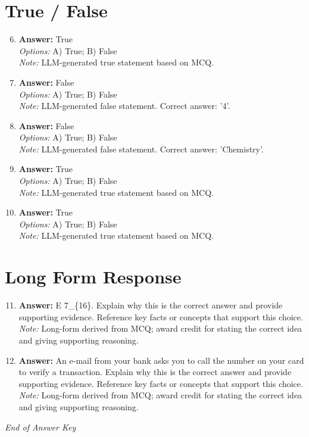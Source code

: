 \documentclass[12pt]{article}
\begin{document}
\section*{True / False}
\begin{enumerate}[label=\arabic*.]
\setcounter{enumi}{5}
\item \textbf{Answer:} True
\\ \textit{Options:} A) True; B) False
\\ \textit{Note:} LLM-generated true statement based on MCQ.
\item \textbf{Answer:} False
\\ \textit{Options:} A) True; B) False
\\ \textit{Note:} LLM-generated false statement. Correct answer: '4'.
\item \textbf{Answer:} False
\\ \textit{Options:} A) True; B) False
\\ \textit{Note:} LLM-generated false statement. Correct answer: 'Chemistry'.
\item \textbf{Answer:} True
\\ \textit{Options:} A) True; B) False
\\ \textit{Note:} LLM-generated true statement based on MCQ.
\item \textbf{Answer:} True
\\ \textit{Options:} A) True; B) False
\\ \textit{Note:} LLM-generated true statement based on MCQ.
\end{enumerate}

\section*{Long Form Response}
\begin{enumerate}[label=\arabic*.]
\setcounter{enumi}{10}
\item \textbf{Answer:} E 7\_\{16\}. Explain why this is the correct answer and provide supporting evidence. Reference key facts or concepts that support this choice.
\\ \textit{Note:} Long-form derived from MCQ; award credit for stating the correct idea and giving supporting reasoning.
\item \textbf{Answer:} An e-mail from your bank asks you to call the number on your card to verify a transaction. Explain why this is the correct answer and provide supporting evidence. Reference key facts or concepts that support this choice.
\\ \textit{Note:} Long-form derived from MCQ; award credit for stating the correct idea and giving supporting reasoning.
\end{enumerate}

\vfill
\noindent\textit{End of Answer Key}
\end{document}
